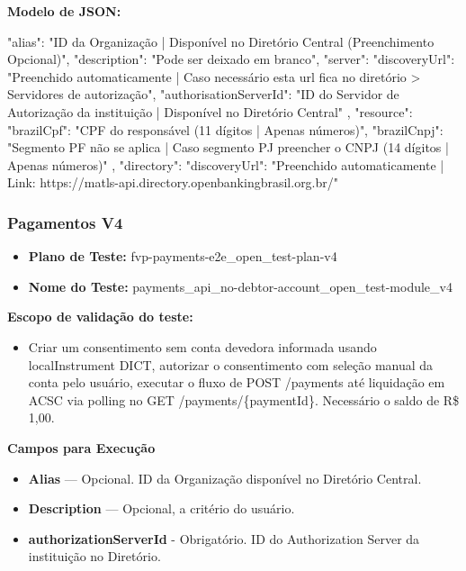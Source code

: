 \begin{figure}[H]
    \centering
    \label{fig:dados}
\end{figure}

\textbf{Modelo de JSON:}

\begin{codeblock}
{
    "alias": "ID da Organização | Disponível no Diretório Central (Preenchimento Opcional)",
    "description": "Pode ser deixado em branco",
    "server": {
        "discoveryUrl": "Preenchido automaticamente | Caso necessário esta url fica no diretório > Servidores de autorização",
        "authorisationServerId": "ID do Servidor de Autorização da instituição | Disponível no Diretório Central"
    },
    "resource": {
        "brazilCpf": "CPF do responsável (11 dígitos | Apenas números)",
        "brazilCnpj": "Segmento PF não se aplica | Caso segmento PJ preencher o CNPJ (14 dígitos | Apenas números)"
    },
    "directory": {
        "discoveryUrl": "Preenchido automaticamente | Link: https://matls-api.directory.openbankingbrasil.org.br/"
    }
}
\end{codeblock}

\subsubsection{Pagamentos V4}
\begin{itemize}
    \item \textbf{Plano de Teste:} fvp-payments-e2e\_open\_test-plan-v4
    \item \textbf{Nome do Teste:} payments\_api\_no-debtor-account\_open\_test-module\_v4
\end{itemize}

\textbf{Escopo de validação do teste:}
\begin{itemize}
    \item Criar um consentimento sem conta devedora informada usando localInstrument DICT, autorizar o consentimento com seleção manual da conta pelo usuário, executar o fluxo de POST /payments até liquidação em ACSC via polling no GET /payments/\{paymentId\}. Necessário o saldo de R\$ 1,00.
\end{itemize}

\textbf{Campos para Execução}

\begin{itemize}
    \item \textbf{Alias} — Opcional. ID da Organização disponível no Diretório Central.
    \item \textbf{Description} — Opcional, a critério do usuário.
    \item \textbf{\textcolor{red!80}{authorizationServerId}} - Obrigatório. ID do Authorization Server da instituição no Diretório.
\end{itemize}


